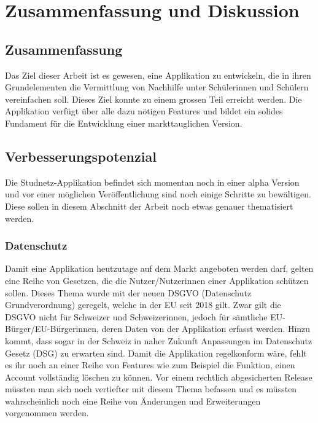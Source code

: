\documentclass[../main.tex]{subfiles}
\begin{document}
	\chapter{Zusammenfassung und Diskussion}
	
	\section{Zusammenfassung}
	Das Ziel dieser Arbeit ist es gewesen, eine Applikation zu entwickeln, die in ihren Grundelementen die Vermittlung von Nachhilfe unter Schülerinnen und Schülern vereinfachen soll. Dieses Ziel konnte zu einem grossen Teil erreicht werden. Die Applikation verfügt über alle dazu nötigen Features und bildet ein solides Fundament für die Entwicklung einer markttauglichen Version.
	
	
	\section{Verbesserungspotenzial}
	Die Studnetz-Applikation befindet sich momentan noch in einer alpha Version und vor einer möglichen Veröffentlichung sind noch einige Schritte zu bewältigen. Diese sollen in diesem Abschnitt der Arbeit noch etwas genauer thematisiert werden.
	
	
	\subsection*{Datenschutz}
	Damit eine Applikation heutzutage auf dem Markt angeboten werden darf, gelten eine Reihe von Gesetzen, die die Nutzer/Nutzerinnen einer Applikation schützen sollen.  Dieses Thema wurde mit der neuen DSGVO (Datenschutz Grundverordnung) geregelt, welche in der EU seit 2018 gilt. Zwar gilt die DSGVO nicht für Schweizer und Schweizerinnen, jedoch für sämtliche EU-Bürger/EU-Bürgerinnen, deren Daten von der Applikation erfasst werden. Hinzu kommt, dass sogar in der Schweiz in naher Zukunft Anpassungen im Datenschutz Gesetz (DSG) zu erwarten sind. Damit die Applikation regelkonform wäre, fehlt es ihr noch an einer Reihe von Features wie zum Beispiel die Funktion, einen Account vollständig löschen zu können. Vor einem rechtlich abgesicherten Release müssten man sich noch vertiefter mit diesem Thema befassen und es müssten wahrscheinlich noch eine Reihe von Änderungen und Erweiterungen vorgenommen werden.  \cite{dsgvoschweiz}
	
\end{document}
